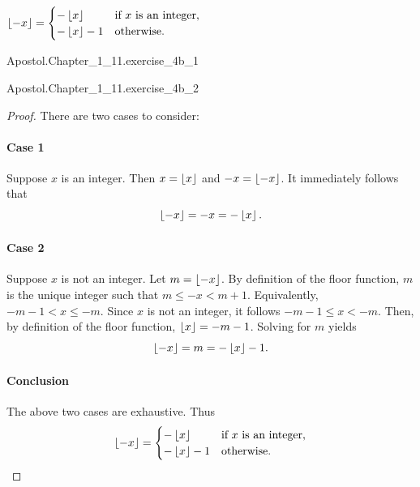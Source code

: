 \documentclass{report}
\begin{document}
\subsubsection{}%

  $\left\lfloor-x\right\rfloor =
    \begin{cases}
      -\left\lfloor x\right\rfloor & \text{if } x \text{ is an integer}, \\
      -\left\lfloor x\right\rfloor - 1 & \text{otherwise}.
    \end{cases}$

    {Apostol.Chapter\_1\_11.exercise\_4b\_1}

    {Apostol.Chapter\_1\_11.exercise\_4b\_2}

  \begin{proof}

    There are two cases to consider:

    \paragraph{Case 1}%

      Suppose $x$ is an integer.
      Then $x = \left\lfloor x\right\rfloor$ and $-x = \left\lfloor-x\right\rfloor$.
      It immediately follows that $$\left\lfloor-x\right\rfloor = -x = -\left\lfloor x\right\rfloor.$$

    \paragraph{Case 2}%

      Suppose $x$ is not an integer.
      Let $m = \left\lfloor-x\right\rfloor$.
      By definition of the floor function, $m$ is the unique integer such that
        $m \leq -x < m + 1$.
      Equivalently, $-m - 1 < x \leq -m$.
      Since $x$ is not an integer, it follows $-m - 1 \leq x < -m$.
      Then, by definition of the floor function, $\left\lfloor x\right\rfloor = -m - 1$.
      Solving for $m$ yields $$\left\lfloor-x\right\rfloor = m = -\left\lfloor x\right\rfloor - 1.$$

    \paragraph{Conclusion}%

      The above two cases are exhaustive. Thus
        $$\left\lfloor-x\right\rfloor =
          \begin{cases}
            -\left\lfloor x\right\rfloor & \text{if } x \text{ is an integer}, \\
            -\left\lfloor x\right\rfloor - 1 & \text{otherwise}.
          \end{cases}$$

  \end{proof}
\end{document}
